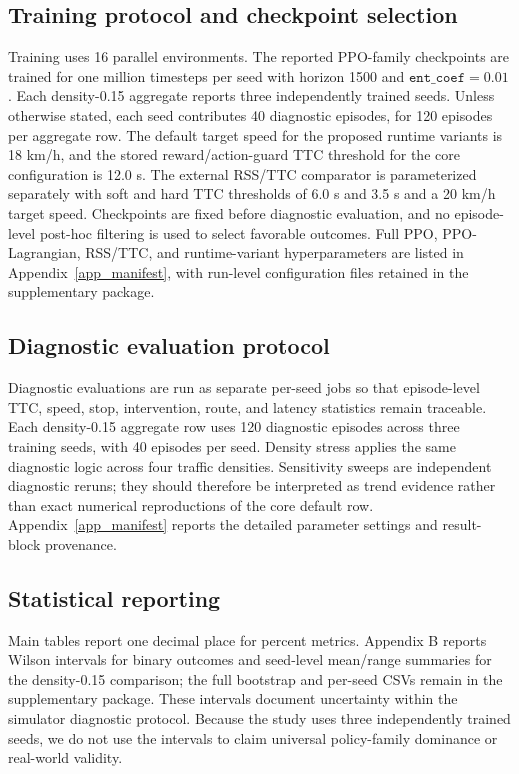 \documentclass[pdflatex,sn-mathphys-ay]{sn-jnl}
\begin{document}
\subsection{Training protocol and checkpoint selection}\label{sec_training_protocol}
Training uses 16 parallel environments. The reported PPO-family checkpoints are trained for one million timesteps per seed with horizon 1500 and \(\texttt{ent\_coef}=0.01\). Each density-0.15 aggregate reports three independently trained seeds. Unless otherwise stated, each seed contributes 40 diagnostic episodes, for 120 episodes per aggregate row. The default target speed for the proposed runtime variants is 18 km/h, and the stored reward/action-guard TTC threshold for the core configuration is 12.0 s. The external RSS/TTC comparator is parameterized separately with soft and hard TTC thresholds of 6.0 s and 3.5 s and a 20 km/h target speed. Checkpoints are fixed before diagnostic evaluation, and no episode-level post-hoc filtering is used to select favorable outcomes. Full PPO, PPO-Lagrangian, RSS/TTC, and runtime-variant hyperparameters are listed in Appendix~\ref{app_manifest}, with run-level configuration files retained in the supplementary package.

\subsection{Diagnostic evaluation protocol}\label{sec_eval_protocol}
Diagnostic evaluations are run as separate per-seed jobs so that episode-level TTC, speed, stop, intervention, route, and latency statistics remain traceable. Each density-0.15 aggregate row uses 120 diagnostic episodes across three training seeds, with 40 episodes per seed. Density stress applies the same diagnostic logic across four traffic densities. Sensitivity sweeps are independent diagnostic reruns; they should therefore be interpreted as trend evidence rather than exact numerical reproductions of the core default row. Appendix~\ref{app_manifest} reports the detailed parameter settings and result-block provenance.

\subsection{Statistical reporting}\label{sec_stats_protocol}
Main tables report one decimal place for percent metrics. Appendix B reports Wilson intervals for binary outcomes and seed-level mean/range summaries for the density-0.15 comparison; the full bootstrap and per-seed CSVs remain in the supplementary package. These intervals document uncertainty within the simulator diagnostic protocol. Because the study uses three independently trained seeds, we do not use the intervals to claim universal policy-family dominance or real-world validity.
\end{document}
